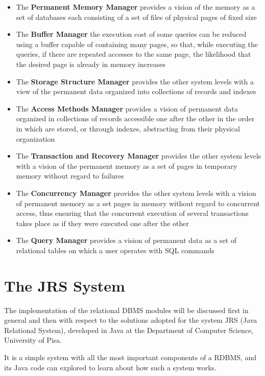 \begin{itemize}
    \item The \textbf{Permanent Memory Manager} provides a vision of the memory as a set of databases each consisting of a set of files of physical pages of fixed size
    \item The \textbf{Buffer Manager} the execution cost of some queries can be reduced using a buffer capable of containing many pages, so that, while executing the queries, if there are repeated accesses to the same page, the likelihood that the desired page is already in memory increases
    \item The \textbf{Storage Structure Manager} provides the other system levels with a view of the permanent data organized into collections of records and indexes
    \item The \textbf{Access Methods Manager} provides a vision of permanent data organized in collections of records accessible one after the other in the order in which are stored, or through indexes, abstracting from their physical organization
    \item The \textbf{Transaction and Recovery Manager} provides the other system levels with a vision of the permanent memory as a set of pages in temporary memory without regard to failures 
    \item The \textbf{Concurrency Manager} provides the other system levels with a vision of permanent memory as a set pages in memory without regard to concurrent access, thus ensuring that the concurrent execution of several transactions takes place as if they were executed one after the other
    \item The \textbf{Query Manager} provides a vision of permanent data as a set of relational tables on which a user operates with SQL commands
\end{itemize}

\section{The JRS System}
The implementation of the relational DBMS modules will be discussed first in general and then with respect to the solutions adopted for the system JRS (Java Relational System), developed in Java at the Department of Computer Science, University of Pisa.

It is a simple system with all the most important components of a RDBMS, and its Java code can explored to learn about how such a system works.